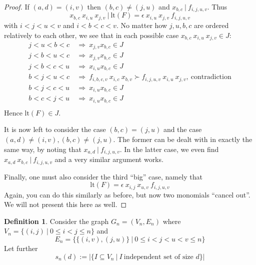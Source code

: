 \documentclass{scrartcl}
\newcommand{\contradiction}{\text{contradiction}}
\newcommand{\divides}{\ | \ }
\theoremstyle{definition}
\newtheorem{definition}{Definition}
\begin{document}
\begin{proof}
    If $(a, d) = (i, v)$ then $(b, c) \neq (j, u)$ and $x_{b, c} \divides f_{i, j, u, v}$.
    Thus
    \begin{equation*}
        x_{b, c} \ x_{i, u} \ x_{j, v} \divides \mathrm{lt}(F) = \epsilon \ x_{i, u} \ x_{j, v} \ f_{i, j, u, v}
    \end{equation*}
    with $i < j < u < v$ and $i < b < c < v$. 
    No matter how $j, u, b, c$ are ordered relatively to each other, we see that in each possible case $x_{b, c} \ x_{i, u} \ x_{j, v} \in J$:
    \begin{align*}
        j < u < b < c \ &\Rightarrow \ x_{j, v} x_{b, c} \in J \\
        j < b < u < c \ &\Rightarrow \ x_{j, v} x_{b, c} \in J \\
        j < b < c < u \ &\Rightarrow \ x_{i, u} x_{b, c} \in J \\
        b < j < u < c \ &\Rightarrow \ f_{i, b, c, v} \ x_{i, c} \ x_{b, v} \succ f_{i, j, u, v} \ x_{i, u} \ x_{j, v}, \ \contradiction \\
        b < j < c < u \ &\Rightarrow \ x_{i, u} x_{b, c} \in J \\
        b < c < j < u \ &\Rightarrow \ x_{i, u} x_{b, c} \in J \\
    \end{align*}
    Hence $\mathrm{lt}(F) \in J$.

    It is now left to consider the case $(b, c) = (j, u)$ and the case $(a, d) \neq (i, v), (b, c) \neq (j, u)$.
    The former can be dealt with in exactly the same way, by noting that $x_{a, d} \divides f_{i, j, u, v}$.
    In the latter case, we even find $x_{a, d} \ x_{b, c} \divides f_{i, j, u, v}$ and a very similar argument works.

    Finally, one must also consider the third ``big'' case, namely that
    \begin{equation*}
        \mathrm{lt}(F) = \epsilon \ x_{i, j} \ x_{u, v} \ f_{i, j, u, v} 
    \end{equation*}
    Again, you can do this similarly as before, but now two monomials ``cancel out''.
    We will not present this here as well.
\end{proof}

\begin{definition}
    Consider the graph $G_n = (V_n, E_n)$ where $V_n = \{ (i, j) \ | \ 0 \leq i < j \leq n \}$ and
    \begin{equation*}
        E_n = \{ \{ (i, v), (j, u) \} \ | \ 0 \leq i < j < u < v \leq n \}
    \end{equation*}
    Let further
    \begin{equation*}
        s_n(d) := |\{ I \subseteq V_n \ | \ I \ \text{independent set of size $d$}\}|
    \end{equation*}
\end{definition}
\end{document}
